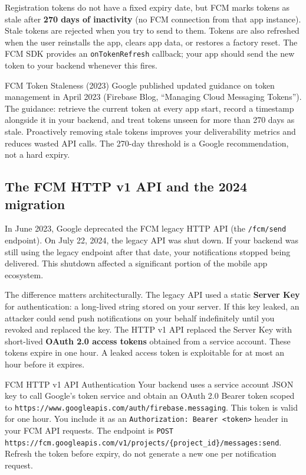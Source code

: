 \documentclass[11pt,a4paper]{article}
\begin{document}
Registration tokens do not have a fixed expiry date, but FCM marks tokens as stale after \textbf{270 days of inactivity} (no FCM connection from that app instance). Stale tokens are rejected when you try to send to them. Tokens are also refreshed when the user reinstalls the app, clears app data, or restores a factory reset. The FCM SDK provides an \texttt{onTokenRefresh} callback; your app should send the new token to your backend whenever this fires.

\begin{industrybox}{FCM Token Staleness (2023)}
Google published updated guidance on token management in April 2023 (Firebase Blog, ``Managing Cloud Messaging Tokens''). The guidance: retrieve the current token at every app start, record a timestamp alongside it in your backend, and treat tokens unseen for more than 270 days as stale. Proactively removing stale tokens improves your deliverability metrics and reduces wasted API calls. The 270-day threshold is a Google recommendation, not a hard expiry.
\end{industrybox}

\subsection{The FCM HTTP v1 API and the 2024 migration}

In June 2023, Google deprecated the FCM legacy HTTP API (the \texttt{/fcm/send} endpoint). On July 22, 2024, the legacy API was shut down. If your backend was still using the legacy endpoint after that date, your notifications stopped being delivered. This shutdown affected a significant portion of the mobile app ecosystem.

The difference matters architecturally. The legacy API used a static \textbf{Server Key} for authentication: a long-lived string stored on your server. If this key leaked, an attacker could send push notifications on your behalf indefinitely until you revoked and replaced the key. The HTTP v1 API replaced the Server Key with short-lived \textbf{OAuth 2.0 access tokens} obtained from a service account. These tokens expire in one hour. A leaked access token is exploitable for at most an hour before it expires.

\begin{termbox}{FCM HTTP v1 API Authentication}
Your backend uses a service account JSON key to call Google's token service and obtain an OAuth 2.0 Bearer token scoped to \texttt{https://www.googleapis.com/auth/firebase.messaging}. This token is valid for one hour. You include it as an \texttt{Authorization: Bearer <token>} header in your FCM API requests. The endpoint is \texttt{POST https://fcm.googleapis.com/v1/projects/\{project\_id\}/messages:send}. Refresh the token before expiry, do not generate a new one per notification request.
\end{termbox}
\end{document}
